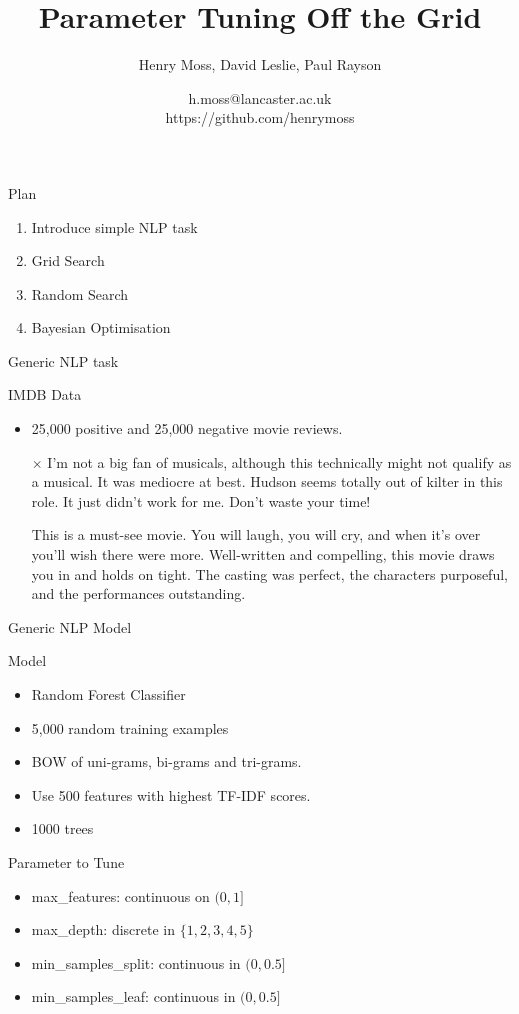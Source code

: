 \documentclass{beamer}
\title{Parameter Tuning Off the Grid}
\author{Henry Moss, David Leslie, Paul Rayson}
\date{h.moss@lancaster.ac.uk\\ https://github.com/henrymoss}
\begin{document}
\begin{frame} 
	\titlepage 
\end{frame}	 
\begin{frame}{Plan}
	\begin{enumerate}
		\item Introduce simple NLP task
		\item Grid Search
		\item Random Search
		\item Bayesian Optimisation 
	\end{enumerate}
\end{frame}

\begin{frame}{Generic NLP task}
	\begin{block}{IMDB Data}
		\begin{itemize}
			\item 25,000 positive and 25,000 negative movie reviews.
			\item [$\times$] I'm not a big fan of musicals, although this technically might not qualify as a musical. It was mediocre at best. Hudson seems totally out of kilter in this role. It just didn't work for me. Don't waste your time!
			\item[\checkmark] This is a must-see movie. You will laugh, you will cry, and when it's over you'll wish there were more. Well-written and compelling, this movie draws you in and holds on tight. The casting was perfect, the characters purposeful, and the performances outstanding.
		\end{itemize}
	\end{block}
\end{frame}
\begin{frame}{Generic NLP Model}

	\begin{block}{Model}
		\begin{itemize}
			\item Random Forest Classifier
			\item 5,000 random training examples
			\item BOW of uni-grams, bi-grams and tri-grams.
			\item Use 500 features with highest TF-IDF scores.
			\item 1000 trees
		\end{itemize}
	\end{block}
	\begin{block}{Parameter to Tune}
			\begin{itemize}
				\item max\_features: continuous on $(0,1]$
				\item max\_depth: discrete in $\{1,2,3,4,5\}$
				\item min\_samples\_split: continuous in $(0,0.5]$
				\item min\_samples\_leaf: continuous in $(0,0.5]$
			\end{itemize}
	\end{block}
\end{frame}
\end{document}
